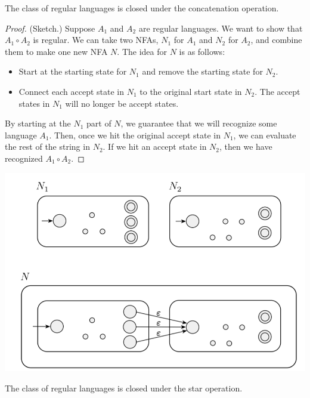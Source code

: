 \documentclass[letterpaper]{article}
\begin{document}
\begin{theorem}{}{}
    The class of regular languages is closed under the concatenation operation.
\end{theorem}

\begin{mdframed}[]
    \begin{proof}
        (Sketch.) Suppose $A_1$ and $A_2$ are regular languages. We want to show that $A_1 \circ A_2$ is regular. We can take two NFAs, $N_1$ for $A_1$ and $N_2$ for $A_2$, and combine them to make one new NFA $N$. The idea for $N$ is as follows: 
        \begin{itemize}
            \item Start at the starting state for $N_1$ and remove the starting state for $N_2$. 
            \item Connect each accept state in $N_1$ to the original start state in $N_2$. The accept states in $N_1$ will no longer be accept states.  
        \end{itemize}
        By starting at the $N_1$ part of $N$, we guarantee that we will recognize some language $A_1$. Then, once we hit the original accept state in $N_1$, we can evaluate the rest of the string in $N_2$. If we hit an accept state in $N_2$, then we have recognized $A_1 \circ A_2$. 
    \end{proof}    
\end{mdframed}

\begin{center}
    \includegraphics[scale=0.5]{assets/concat_nfa.png}
\end{center}


\begin{theorem}{}{}
    The class of regular languages is closed under the star operation.
\end{theorem}
\end{document}

